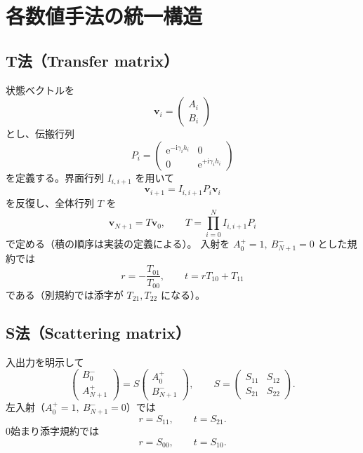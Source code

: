 \documentclass[a4paper,11pt]{article}
\newcommand{\ii}{\mathrm{i}}
\newcommand{\ee}{\mathrm{e}}
\begin{document}
\section{各数値手法の統一構造}

\subsection{T法（Transfer matrix）}
状態ベクトルを
\begin{equation}
\bm{v}_i=
\begin{pmatrix}
A_i \\ B_i
\end{pmatrix}
\end{equation}
とし、伝搬行列
\begin{equation}
P_i=
\begin{pmatrix}
\ee^{-\ii\gamma_i h_i} & 0 \\
0 & \ee^{+\ii\gamma_i h_i}
\end{pmatrix}
\end{equation}
を定義する。界面行列 $I_{i,i+1}$ を用いて
\begin{equation}
\bm{v}_{i+1}=I_{i,i+1}P_i\bm{v}_i
\end{equation}
を反復し、全体行列 $T$ を
\begin{equation}
\bm{v}_{N+1}=T\bm{v}_0,\qquad
T=\prod_{i=0}^{N} I_{i,i+1}P_i
\end{equation}
で定める（積の順序は実装の定義による）。
入射を $A_0^+=1,\ B_{N+1}^-=0$ とした規約では
\begin{equation}
r=-\frac{T_{01}}{T_{00}},\qquad
t=rT_{10}+T_{11}
\end{equation}
である（別規約では添字が $T_{21},T_{22}$ になる）。

\subsection{S法（Scattering matrix）}
入出力を明示して
\begin{equation}
\begin{pmatrix}
B_0^-\\
A_{N+1}^+
\end{pmatrix}
=
S
\begin{pmatrix}
A_0^+\\
B_{N+1}^-
\end{pmatrix},
\qquad
S=
\begin{pmatrix}
S_{11}&S_{12}\\
S_{21}&S_{22}
\end{pmatrix}.
\end{equation}
左入射（$A_0^+=1,\ B_{N+1}^-=0$）では
\begin{equation}
r=S_{11},\qquad t=S_{21}.
\end{equation}
0始まり添字規約では
\begin{equation}
r=S_{00},\qquad t=S_{10}.
\end{equation}
\end{document}
